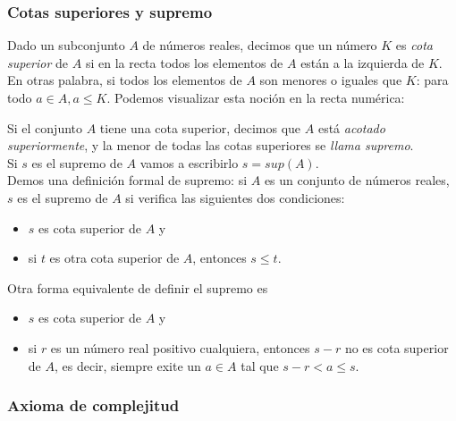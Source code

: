 \documentclass[Análisis.root.tex]{subfiles}
\begin{document}
        \subsubsection{Cotas superiores y supremo}
        Dado un subconjunto \(A\) de números reales, decimos que un número \(K\) es \textit{cota superior} de \(A\) si en la recta todos los elementos de \(A\) están a la izquierda de \(K\). En otras palabra, si todos los elementos de \(A\) son menores o iguales que \(K\): para todo \(a \in A, a \leq K\). Podemos visualizar esta noción en la recta numérica:
        \begin{center}
        \end{center}
        Si el conjunto \(A\) tiene una cota superior, decimos que \(A\) está \textit{acotado superiormente}, y la menor de todas las cotas superiores se \textit{llama supremo}.\\
        Si \(s\) es el supremo de \(A\) vamos a escribirlo \(s = sup(A)\).\\
        Demos una definición formal de supremo: si \(A\) es un conjunto de números reales, \(s\) es el supremo de \(A\) si verifica las siguientes dos condiciones:
        \begin{itemize}
            \item \(s\) es cota superior de \(A\) y
            \item si \(t\) es otra cota superior de \(A\), entonces \(s \leq t\).
        \end{itemize}
        Otra forma equivalente de definir el supremo es
        \begin{itemize}
            \item \(s\) es cota superior de \(A\) y
            \item si \(r\) es un número real positivo cualquiera, entonces \(s - r\) no es cota superior de \(A\), es decir, siempre exite un \(a \in A\) tal que \(s - r < a \leq s\).
        \end{itemize}
        \subsubsection{Axioma de complejitud}
\end{document}

